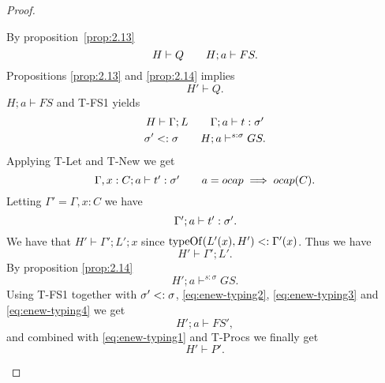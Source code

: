 \begin{proof}
\begin{description}
\begin{description}
\begin{description}
              By proposition~\ref{prop:2.13}
              \begin{equation} 
                H \vdash Q \quad\quad H; a \vdash FS.
              \end{equation}
              Propositions \ref{prop:2.13} and \ref{prop:2.14} implies
              \begin{equation} \label{eq:enew-typing1}
                H' \vdash Q.
              \end{equation}
              $H;a \vdash FS$ and {\sc T-FS1} yields
              \begin{equation}
                \begin{gathered}
                  H \vdash \Gamma; L \quad\quad \mbox{$\Gamma;a\vdash t:\sigma'$}
                  \\
                  \sigma' <: \sigma \quad\quad H;a \vdash^{s: \sigma} GS.
                \end{gathered} 
              \end{equation}
              Applying {\sc T-Let} and {\sc T-New} we get
              \begin{equation} \label{eq:enew-typing5}
                \mbox{$\Gamma, x: C;a\vdash t':\sigma'$} \quad\quad a = \mbox{$ocap$}
                \implies \mbox{$ocap$}(C).
              \end{equation}
              Letting $\Gamma' = \Gamma, x: C$ we have
              \begin{equation} \label{eq:enew-typing2}
                \mbox{$\Gamma';a\vdash t':\sigma'$}.
              \end{equation}
              We have that $H' \vdash \Gamma';L';x$ since $\mbox{$\mathrm{typeOf}$}(L'(x), H')
              <: \Gamma'(x)$. Thus we have
              \begin{equation} \label{eq:enew-typing3}
                H' \vdash \Gamma'; L'.
              \end{equation}
              By proposition \ref{prop:2.14}
              \begin{equation} \label{eq:enew-typing4}
                H';a \vdash^{s: \sigma} GS.
              \end{equation}
              Using {\sc T-FS1} together with $\sigma' <: \sigma$, \eqref{eq:enew-typing2},
              \eqref{eq:enew-typing3} and \eqref{eq:enew-typing4} we get
              \begin{equation}
                H';a \vdash FS',
              \end{equation}
              and combined with \eqref{eq:enew-typing1} and {\sc T-Procs} we finally
              get
              \begin{equation}
                H' \vdash P'.
              \end{equation}


\end{description}
\end{description}
\end{description}
\end{proof}
